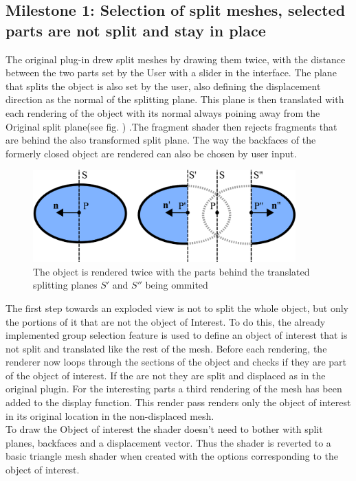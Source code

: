 \subsection{Milestone 1: Selection of split meshes, selected parts are not split and stay in place} The original plug-in drew split meshes by drawing them twice, with the distance between the two parts set by the User with a slider in the interface. The plane  that splits the object is also set by the user, also defining the displacement direction as the normal of the splitting plane. This plane is then translated with each rendering of the object with its normal always poining away from the Original split plane(see fig. \label{fig:splitting_explained}) .The fragment shader then rejects fragments that are behind the also transformed split plane. The way the backfaces of the formerly closed object are rendered can also be chosen by user input.\\
\begin{figure}[tb]
	\centering
	\includegraphics[width=0.9\textwidth]{chapters/figures/splitting_explained}
	\caption{The object is rendered twice with the parts behind the translated splitting planes $S'$ and $S''$ being ommited}
	\label{fig:splitting_explained}
\end{figure}
The first step towards an exploded view is not to split the whole object, but only the portions of it that are not the object of Interest. To do this, the already implemented group selection feature is used to define an object of interest that is not split and translated like the rest of the mesh. Before each rendering, the renderer now loops through the sections of the object and checks if they are part of the object  of interest. If the are not they are split and displaced as in the original plugin. For the interesting parts a third rendering of the mesh has been added to the display function. This render pass renders only the object of interest in its original location in the non-displaced mesh.\\
To draw the Object of interest the shader doesn't need to bother with split planes, backfaces and a displacement vector. Thus the shader is reverted to a basic triangle mesh shader when created with the options corresponding to the object of interest.\\
